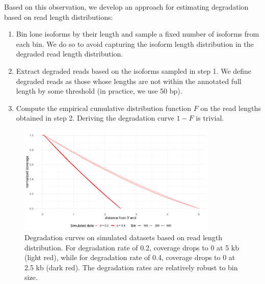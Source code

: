 Based on this observation, we develop an approach for estimating degradation based on read length distributions:
\begin{enumerate}
    \item Bin lone isoforms by their length and sample a fixed number of isoforms from each bin. We do so to avoid capturing the isoform length distribution in the degraded read length distribution.  
    \item Extract degraded reads based on the isoforms sampled in step 1. We define degraded reads as those whose lengths are not within the annotated full length by some threshold (in practice, we use 50 bp). 
    \item Compute the empirical cumulative distribution function $F$ on the read lengths obtained in step 2. Deriving the degradation curve $1-F$ is trivial. 
\end{enumerate}

\begin{figure}[H]
    \centering
    \includegraphics[width=0.85\textwidth]{figures/sec-2-length-sim.png}
    \caption[Degradation curves on simulated datasets based on read length distribution]{Degradation curves on simulated datasets based on read length distribution. For degradation rate of 0.2, coverage drops to 0 at 5 kb (light red), while for degradation rate of 0.4, coverage drops to 0 at 2.5 kb (dark red). The degradation rates are relatively robust to bin size.}
    \label{fig:length-sim}
\end{figure}


